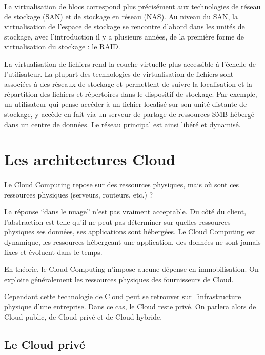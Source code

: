\documentclass[a4paper,12pt]{report}
\begin{document}
\begin{onehalfspace}
	La virtualisation de blocs correspond plus précisément aux technologies de réseau de stockage 
(SAN) et de stockage en réseau (NAS). Au niveau du SAN, la virtualisation de l'espace de stockage se rencontre d'abord dans les unités de stockage, avec l'introduction il y a plusieurs années, de la première forme de virtualisation du stockage : le RAID.
 
	La virtualisation de fichiers rend la couche virtuelle plus accessible à l'échelle de l'utilisateur. La plupart des technologies de virtualisation de fichiers sont associées à des réseaux de stockage et permettent de suivre la localisation et la répartition des fichiers et répertoires dans 
le dispositif de stockage. Par exemple, un utilisateur qui pense accéder à un fichier localisé sur 
son unité distante de stockage, y accède en fait via un serveur de partage de ressources SMB hébergé dans un centre de données. Le réseau principal est ainsi libéré et dynamisé.  
	
	\section{Les architectures Cloud}

	\paragraph*{}
	Le Cloud Computing repose sur des ressources physiques, mais où sont ces ressources physiques (serveurs, routeurs, etc.) ?
	
	La réponse “dans le nuage” n’est pas vraiment acceptable. Du côté du client, l’abstraction est telle qu’il ne peut pas déterminer sur quelles ressources physiques ses données, ses applications sont hébergées. Le Cloud Computing est dynamique, les ressources hébergeant une application, des données ne sont jamais fixes et évoluent dans le temps.
	
En théorie, le Cloud Computing n’impose aucune dépense en immobilisation. On exploite généralement les ressources physiques des fournisseurs de Cloud.

	Cependant cette technologie de Cloud peut se retrouver sur l’infrastructure physique d’une entreprise. Dans ce cas, le Cloud reste privé. On parlera alors de Cloud public, de Cloud privé et de Cloud hybride.
	
	\subsection{Le Cloud privé}
	

\end{onehalfspace}
\end{document}
